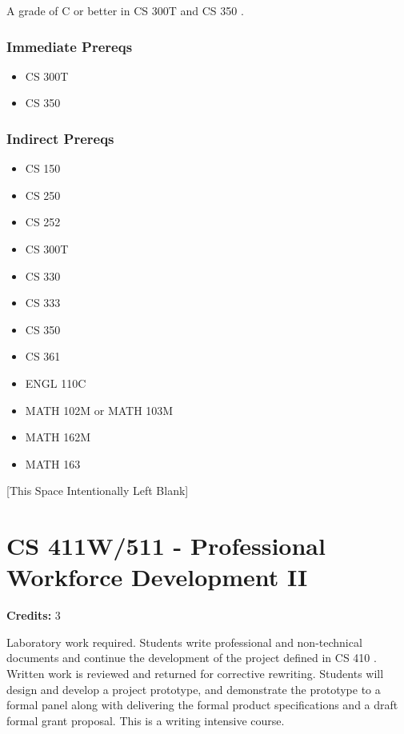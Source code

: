\documentclass[]{article}
\providecommand{\tightlist}{%
  \setlength{\itemsep}{0pt}\setlength{\parskip}{0pt}}
\newcommand{\pagebreakhere}{
\vspace*{\fill}
\begin{center}
[This Space Intentionally Left Blank]
\end{center}
\vspace*{\fill}
\newpage
}
\begin{document}
A grade of C or better in CS 300T and CS 350 .

\subsubsection{Immediate Prereqs}\label{immediate-prereqs-18}

\begin{itemize}
\tightlist
\item
  CS 300T
\item
  CS 350
\end{itemize}

\subsubsection{Indirect Prereqs}\label{indirect-prereqs-18}

\begin{itemize}
\tightlist
\item
  CS 150
\item
  CS 250
\item
  CS 252
\item
  CS 300T
\item
  CS 330
\item
  CS 333
\item
  CS 350
\item
  CS 361
\item
  ENGL 110C
\item
  MATH 102M or MATH 103M
\item
  MATH 162M
\item
  MATH 163
\end{itemize}

\pagebreakhere
\section{CS 411W/511 - Professional Workforce Development
II}\label{cs-411w511---professional-workforce-development-ii}

\textbf{Credits:} 3

Laboratory work required. Students write professional and non-technical
documents and continue the development of the project defined in CS 410
. Written work is reviewed and returned for corrective rewriting.
Students will design and develop a project prototype, and demonstrate
the prototype to a formal panel along with delivering the formal product
specifications and a draft formal grant proposal. This is a writing
intensive course.
\end{document}
